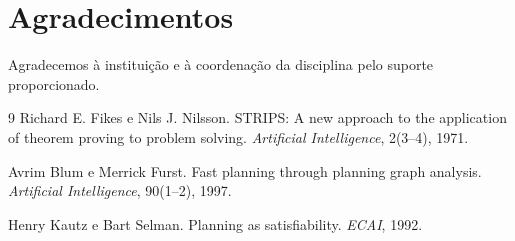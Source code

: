 \documentclass[12pt]{article}
\begin{document}
\section*{Agradecimentos}
Agradecemos à instituição e à coordenação da disciplina pelo suporte proporcionado.

\begin{thebibliography}{9}
Richard E. Fikes e Nils J. Nilsson. STRIPS: A new approach to the application of theorem proving to problem solving. \emph{Artificial Intelligence}, 2(3–4), 1971.

Avrim Blum e Merrick Furst. Fast planning through planning graph analysis. \emph{Artificial Intelligence}, 90(1–2), 1997.

Henry Kautz e Bart Selman. Planning as satisfiability. \emph{ECAI}, 1992.
\end{thebibliography}
\end{document}
